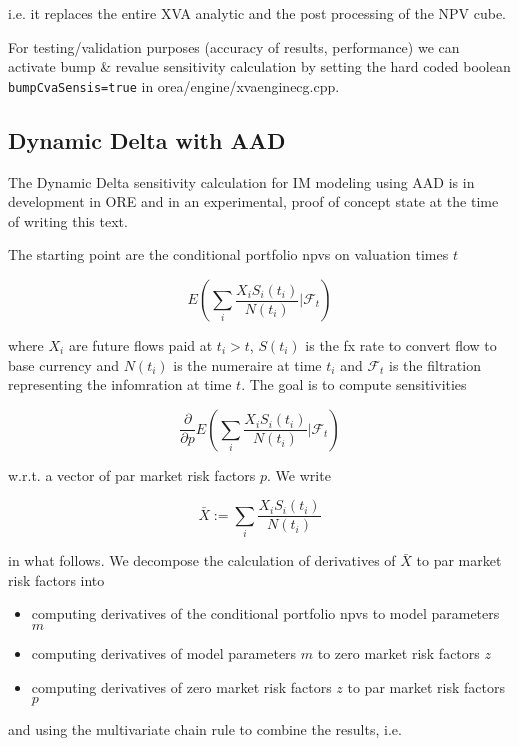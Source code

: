 i.e. it replaces the entire XVA analytic and the post processing of the NPV cube.

For testing/validation purposes (accuracy of results, performance) we can activate bump \& revalue sensitivity
calculation by setting the hard coded boolean {\tt bumpCvaSensis=true} in orea/engine/xvaenginecg.cpp.

\subsection{Dynamic Delta with AAD}

The Dynamic Delta sensitivity calculation for IM modeling using AAD is in development in ORE and in an experimental,
proof of concept state at the time of writing this text.

The starting point are the conditional portfolio npvs on valuation times $t$

$$
E\left( \sum_i \frac{X_i S_i(t_i)}{N(t_i)} \bigg| \mathcal{F}_t \right)
$$

where $X_i$ are future flows paid at $t_i > t$, $S(t_i)$ is the fx rate to convert flow to base currency and $N(t_i)$ is
the numeraire at time $t_i$ and $\mathcal{F}_t$ is the filtration representing the infomration at time $t$. The goal is
to compute sensitivities

$$
\frac{\partial}{\partial p}E\left( \sum_i \frac{X_i S_i(t_i)}{N(t_i)} \bigg| \mathcal{F}_t \right)
$$

w.r.t. a vector of par market risk factors $p$. We write

$$
\bar{X} := \sum_i \frac{X_i S_i(t_i)}{N(t_i)}
$$

in what follows. We decompose the calculation of derivatives of $\bar{X}$ to par market risk factors into

\begin{itemize}
\item computing derivatives of the conditional portfolio npvs to model parameters $m$
\item computing derivatives of model parameters $m$ to zero market risk factors $z$
\item computing derivatives of zero market risk factors $z$ to par market risk factors $p$
\end{itemize}

and using the multivariate chain rule to combine the results, i.e.

